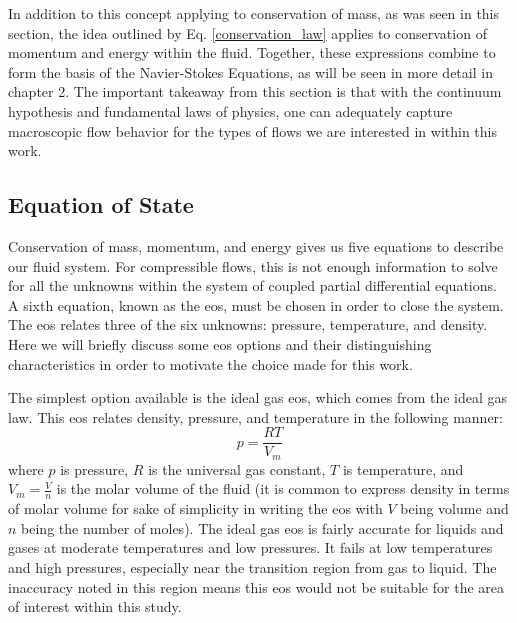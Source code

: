 In addition to this concept applying to conservation of mass, as was seen in this section, the idea outlined by Eq. \ref{conservation_law} applies to conservation of momentum and energy within the fluid. Together, these expressions combine to form the basis of the Navier-Stokes Equations, as will be seen in more detail in chapter 2. The important takeaway from this section is that with the continuum hypothesis and fundamental laws of physics, one can adequately capture macroscopic flow behavior for the types of flows we are interested in within this work.  

\subsection{Equation of State}
Conservation of mass, momentum, and energy gives us five equations to describe our fluid system. For compressible flows, this is not enough information to solve for all the unknowns within the system of coupled partial differential equations. A sixth equation, known as the \gls{eos}, must be chosen in order to close the system. The \gls{eos} relates three of the six unknowns: pressure, temperature, and density. Here we will briefly discuss some \gls{eos} options and their distinguishing characteristics in order to motivate the choice made for this work. 

The simplest option available is the ideal gas \gls{eos}, which comes from the ideal gas law. This \gls{eos} relates density, pressure, and temperature in the following manner: 
\begin{equation} \label{ideal_gas}
p = \dfrac{RT}{V_m}
\end{equation}
where $p$ is pressure, $R$ is the universal gas constant, $T$ is temperature, and $V_m = \tfrac{V}{n}$ is the molar volume of the fluid (it is common to express density in terms of molar volume for sake of simplicity in writing the \gls{eos} with $V$ being volume and $n$ being the number of moles). The ideal gas \gls{eos} is fairly accurate for liquids and gases at moderate temperatures and low pressures. It fails at low temperatures and high pressures, especially near the transition region from gas to liquid. The inaccuracy noted in this region means this \gls{eos} would not be suitable for the area of interest within this study. 

